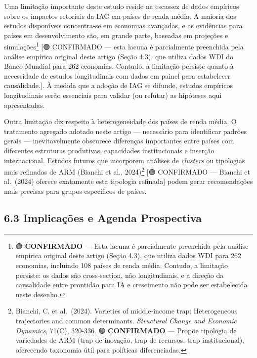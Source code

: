 \documentclass[
  brazilian,
  12pt,
]{article}
\begin{document}
Uma limitação importante deste estudo reside na escassez de dados empíricos sobre os impactos setoriais da IAG em países de renda média. A maioria dos estudos disponíveis concentra-se em economias avançadas, e as evidências para países em desenvolvimento são, em grande parte, baseadas em projeções e simulações\footnote{🟢 \textbf{CONFIRMADO} --- Esta lacuna é parcialmente preenchida pela análise empírica original deste artigo (Seção 4.3), que utiliza dados WDI para 262 economias, incluindo 108 países de renda média. Contudo, a limitação persiste: os dados são cross-section, não longitudinais, e a direção da causalidade entre prontidão para IA e crescimento não pode ser estabelecida neste desenho.} {[}🟢 CONFIRMADO --- esta lacuna é parcialmente preenchida pela análise empírica original deste artigo (Seção 4.3), que utiliza dados WDI do Banco Mundial para 262 economias. Contudo, a limitação persiste quanto à necessidade de estudos longitudinais com dados em painel para estabelecer causalidade.{]}. À medida que a adoção de IAG se difunde, estudos empíricos longitudinais serão essenciais para validar (ou refutar) as hipóteses aqui apresentadas.

Outra limitação diz respeito à heterogeneidade dos países de renda média. O tratamento agregado adotado neste artigo --- necessário para identificar padrões gerais --- inevitavelmente obscurece diferenças importantes entre países com diferentes estruturas produtivas, capacidades institucionais e inserção internacional. Estudos futuros que incorporem análises de \emph{clusters} ou tipologias mais refinadas de ARM (Bianchi et al., 2024)\footnote{Bianchi, C. et al.~(2024). Varieties of middle-income trap: Heterogeneous trajectories and common determinants. \emph{Structural Change and Economic Dynamics}, 71(C), 320-336. 🟢 \textbf{CONFIRMADO} --- Propõe tipologia de variedades de ARM (trap de inovação, trap de recursos, trap institucional), oferecendo taxonomia útil para políticas diferenciadas.} {[}🟢 CONFIRMADO --- Bianchi et al.~(2024) oferece exatamente esta tipologia refinada{]} podem gerar recomendações mais precisas para grupos específicos de países.

\subsection{6.3 Implicações e Agenda Prospectiva}\label{implicauxe7uxf5es-e-agenda-prospectiva}
\end{document}
